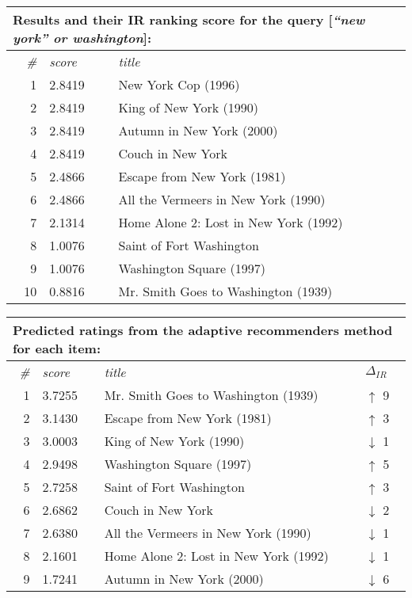 \begin{table}[h]
  \centering 

  \begin{tabular*}{0.9\textwidth}{ r l p{8cm} }
    \multicolumn{3}{l}{Results and their IR ranking score for the query [\emph{``new york'' or washington}]:}\\
    \toprule
    \emph{\#} & \emph{score} & \emph{title}\\
    \midrule
    1 & 2.8419  &  New York Cop (1996)                    \\
    2 & 2.8419  &  King of New York (1990)                \\
    3 & 2.8419  &  Autumn in New York (2000)              \\
    4 & 2.8419  &  Couch in New York                      \\
    5 & 2.4866  &  Escape from New York (1981)            \\
    6 & 2.4866  &  All the Vermeers in New York (1990)    \\
    7 & 2.1314  &  Home Alone 2: Lost in New York (1992)  \\
    8 & 1.0076  &  Saint of Fort Washington               \\
    9 & 1.0076  &  Washington Square (1997)               \\
    10& 0.8816  &  Mr. Smith Goes to Washington (1939)    \\
    \bottomrule
  \end{tabular*}

  \vspace{1em} 

  \begin{tabular*}{0.9\textwidth}{ r l p{8.5cm} l }
    \multicolumn{4}{l}{Predicted ratings from the adaptive recommenders method for each item:}\\
    \toprule
    \emph{\#} & \emph{score} & \emph{title} & $\Delta_{IR}$\\
    \midrule
    1 & 3.7255  &  Mr. Smith Goes to Washington (1939)    & \color{green} $\uparrow$ 9 \\
    2 & 3.1430  &  Escape from New York (1981)            & \color{green} $\uparrow$ 3 \\
    3 & 3.0003  &  King of New York (1990)                & \color{red} $\downarrow$ 1 \\
    4 & 2.9498  &  Washington Square (1997)               & \color{green} $\uparrow$ 5 \\
    5 & 2.7258  &  Saint of Fort Washington               & \color{green} $\uparrow$ 3 \\
    6 & 2.6862  &  Couch in New York                      & \color{red} $\downarrow$ 2 \\
    7 & 2.6380  &  All the Vermeers in New York (1990)    & \color{red} $\downarrow$ 1 \\
    8 & 2.1601  &  Home Alone 2: Lost in New York (1992)  & \color{red} $\downarrow$ 1 \\
    9 & 1.7241  &  Autumn in New York (2000)              & \color{red} $\downarrow$ 6 \\
    \bottomrule
  \end{tabular*}


\end{table}
